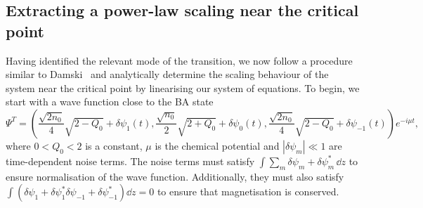 \subsection{Extracting a power-law scaling near the critical point}
Having identified the relevant mode of the transition, we now follow a procedure
similar to Damski~\cite{Damski2007} and analytically determine the scaling
behaviour of the system near the critical point by linearising our system of
equations.
To begin, we start with a wave function close to the BA state
\begin{equation}\label{eq: spin-1-perturbed-BA-state}
    \Psi^T = \left(\frac{\sqrt{2n_0}}{4}\sqrt{2 - Q_0} + \delta\psi_{1}(t),
    \frac{\sqrt{n_0}}{2}\sqrt{2 + Q_0} + \delta \psi_0(t),
    \frac{\sqrt{2n_0}}{4}\sqrt{2 - Q_0} + \delta\psi_{-1}(t)\right)e^{-i\mu t},
\end{equation}
where \( 0 < Q_0 < 2 \) is a constant, \(\mu \) is the
chemical potential and \( |\delta\psi_m| \ll 1 \) are time-dependent noise
terms.
The noise terms must satisfy \(\int \sum_m\delta\psi_m+\delta\psi_m^* \, \dd z\)
to ensure normalisation of the wave function.
Additionally, they must also satisfy \(\int (\delta\psi_1 + \delta\psi_1^* 
\delta\psi_{-1} + \delta\psi_{-1}^*) \dd z = 0\) to ensure that magnetisation
is conserved.

